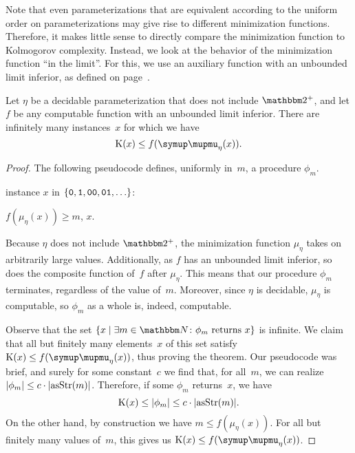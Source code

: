 Note that even parameterizations that are equivalent according to the uniform order on parameterizations may give rise to different minimization functions.
Therefore, it makes little sense to directly compare the minimization function to Kolmogorov complexity.
Instead, we look at the behavior of the minimization function \enquote{in the limit}.
For this, we use an auxiliary function with an unbounded limit inferior, as defined on page~\pageref{def:liminf}.
\begin{theorem}
\label{thm:parameterizedicc}%
  Let $\eta$ be a decidable parameterization that does not include $\binary^+$, and let $f$ be any computable function with an unbounded limit inferior.
  There are infinitely many instances~$x$ for which we have
  \begin{equation*}
    \KC(x) \le f(\mu_\eta(x)).
  \end{equation*}
\end{theorem}
\begin{proof}
  The following pseudocode defines, uniformly in~$m$, a procedure $\phi_m$.
  \begin{codelisting}
  \item
     instance $x$ in $\{\bits{0}, \bits{1}, \bits{00}, \bits{01}, \ldots\}$:
    \begin{codelisting}
      \item {} $f(\mu_\eta(x)) \ge m$,  $x$.
    \end{codelisting}
  \end{codelisting}

  Because $\eta$ does not include $\binary^+$, the minimization function $\mu_\eta$ takes on arbitrarily large values.
  Additionally, as $f$ has an unbounded limit inferior, so does the composite function of~$f$ after $\mu_\eta$.
  This means that our procedure $\phi_m$ terminates, regardless of the value of~$m$.
  Moreover, since $\eta$ is decidable, $\mu_\eta$ is computable, so $\phi_m$ as a whole is, indeed, computable.

  Observe that the set $\{x \st \exists m \in \bbN\colon \text{$\phi_m$ returns $x$}\}$ is infinite.
  We claim that all but finitely many elements~$x$ of this set satisfy $\KC(x) \le f(\mu_\eta(x))$, thus proving the theorem.
  Our pseudocode was brief, and surely for some constant~$c$ we find that, for all~$m$, we can realize ${\lvert\phi_m\rvert} \le c \cdot {\lvert\operatorname{asStr}(m)\rvert}$.
  Therefore, if some $\phi_m$ returns~$x$, we have
  \begin{equation*}
    \operatorname{K}(x) \le {\lvert\phi_m\rvert} \le c \cdot {\lvert\operatorname{asStr}(m)\rvert}.
  \end{equation*}
  On the other hand, by construction we have $m \le f(\mu_\eta(x))$.
  For all but finitely many values of~$m$, this gives us $\KC(x) \le f(\mu_\eta(x))$.
\end{proof}

